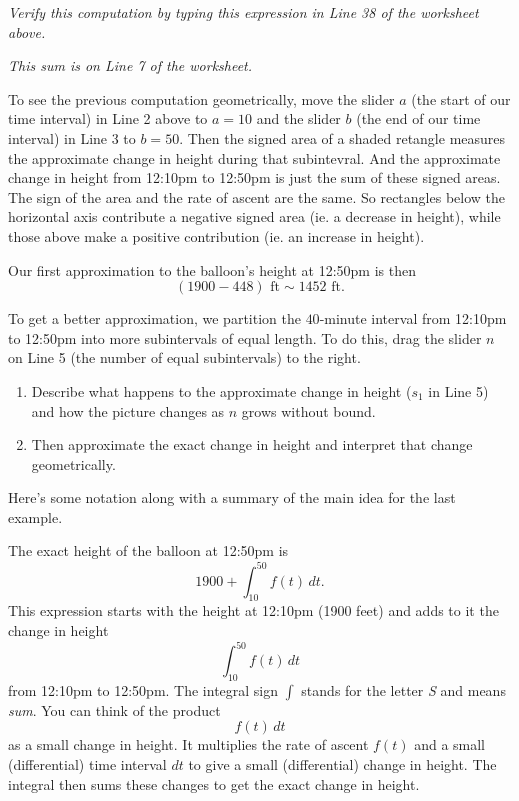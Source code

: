 \documentclass{ximera}
\begin{document}
\begin{example}
\emph{Verify this computation by typing this expression in Line 38 of the worksheet above.}

\emph{This sum is on Line 7 of the worksheet.}

To see the previous computation geometrically, move the slider $a$ (the start of our time interval) in Line 2 above to $a=10$ and the slider $b$ (the end of our time interval) in Line 3 to $b=50$. Then the signed area of a shaded retangle measures the approximate change in height during that subintevral. And the approximate change in height from 12:10pm to 12:50pm is just the sum of these signed areas. The sign of the area and the rate of ascent are the same. So rectangles below the horizontal axis contribute a negative signed area (ie. a decrease in height), while those above make a positive contribution (ie. an increase in height).

Our first approximation to the balloon's height at 12:50pm is then 
\[
    (1900  - 448 )\text{ ft} \sim 1452 \text{ ft}.
\]

To get a better approximation, we partition the $40$-minute interval from 12:10pm to 12:50pm into more subintervals of equal length. To do this, drag the slider $n$ on Line 5 (the number of equal subintervals) to the right.

\begin{enumerate}
\item Describe what happens to the approximate change in height ($s_1$ in Line 5) and how the picture changes as $n$ grows without bound. 

\item Then approximate the exact change in height and interpret that change geometrically. 

\end{enumerate}
\begin{freeResponse}
\end{freeResponse}

\end{example} 


Here's some notation along with a summary of the main idea for the last example.
 
The exact height of the balloon at 12:50pm is 
\[
     1900 + \int_{10}^{50} f(t)\, dt .
\]
This expression starts with the height at 12:10pm (1900 feet) and adds to it the change in height
\[
   \int_{10}^{50} f(t)\, dt 
\]
from 12:10pm to 12:50pm. The integral sign $\int$ stands for the letter \emph{S} and means \emph{sum}. You can think of the product
\[
   f(t) \, dt
\]
as a small change in height. It multiplies the rate of ascent $f(t)$ and a small (differential) time interval $dt$ to give a small (differential) change in height. The integral then sums these changes to get the exact change in height.
\end{document}
